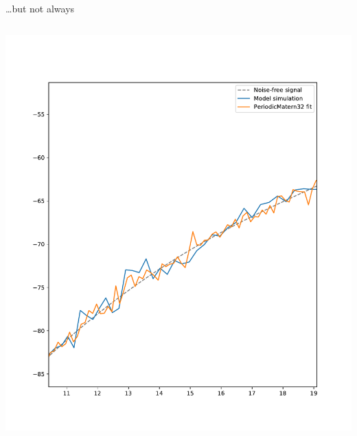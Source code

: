 \documentclass[presentation]{beamer}
\begin{document}
\begin{frame}[plain,label={sec:org91fcb75}]{\ldots{}but not always}
\begin{columns}
\begin{column}{0.5\columnwidth}
\begin{center}
\includegraphics[width=1.1\textwidth]{./Matern3.pdf}
\end{center}
\end{column}
\end{columns}
\end{frame}
\end{document}
